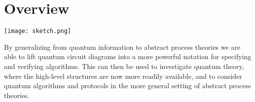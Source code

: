 \chapter{Overview}

\texttt{[image: sketch.png]}

By generalizing from quantum information to abstract process theories we are able to lift quantum circuit diagrams into a more powerful notation for specifying and verifying algorithms.  This can then be used to investigate quantum theory, where the high-level structures are now more readily available, and to consider quantum algorithms and protocols in the more general setting of abstract process theories.
